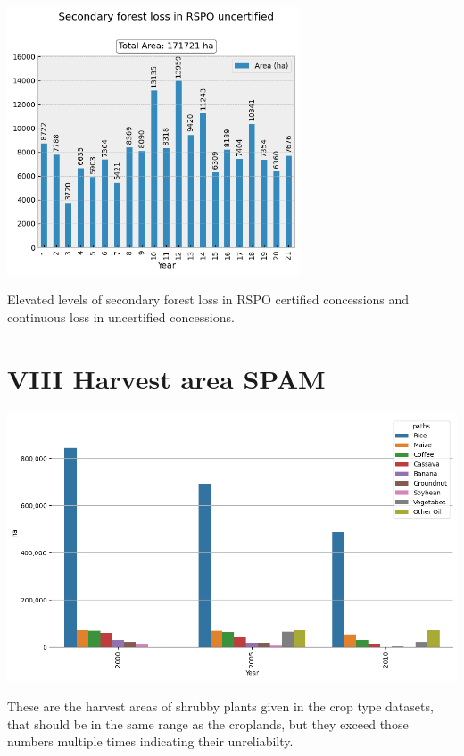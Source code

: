 \documentclass[
  letterpaper,
  DIV=11,
  numbers=noendperiod]{scrreprt}
\begin{document}
\includegraphics[width=0.65\textwidth,height=\textheight]{text/../code/results/plots/RSPO_secondary_forest_loss_uncertified.png}

\normalcolor

Elevated levels of secondary forest loss in RSPO certified concessions
and continuous loss in uncertified concessions.

\newpage

\hypertarget{harvest-area-spam}{%
\section*{\texorpdfstring{\textsc{VIII} Harvest area
SPAM}{ Harvest area SPAM}}\label{harvest-area-spam}}


\color{white}

\includegraphics{text/../code/results/final_plots/SPAM_crops.png}
\normalcolor

These are the harvest areas of shrubby plants given in the crop type
datasets, that should be in the same range as the croplands, but they
exceed those numbers multiple times indicating their unreliabilty.
\end{document}
